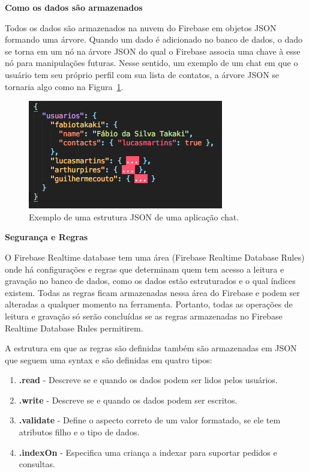 \documentclass[12pt]{article}
\begin{document}
\textbf{Como os dados são armazenados}

Todos os dados são armazenados na nuvem do Firebase em objetos JSON formando uma árvore. Quando um dado é adicionado no banco de dados, o dado se torna em um nó na árvore JSON do qual o Firebase associa uma chave à esse nó para manipulações futuras. Nesse sentido, um exemplo de um chat em que o usuário tem seu próprio perfil com sua lista de contatos, a árvore JSON se tornaria algo como na Figura~\ref{fig:json-tree}.

\begin{figure}[ht]
\centering
\includegraphics[width=.5\textwidth]{json-tree.png}
\caption{Exemplo de uma estrutura JSON de uma aplicação chat.}
\label{fig:json-tree}
\end{figure}


\textbf{Segurança e Regras}

O Firebase Realtime database tem uma área (Firebase Realtime Database Rules) onde há configurações e regras que determinam quem tem acesso a leitura e gravação no banco de dados, como os dados estão estruturados e o qual índices existem. Todas as regras ficam armazenadas nessa área do Firebase e podem ser alteradas a qualquer momento na ferramenta. Portanto, todas as operações de leitura e gravação só serão concluídas se as regras armazenadas no Firebase Realtime Database Rules permitirem. 

A estrutura em que as regras são definidas também são armazenadas em JSON que seguem uma syntax e são definidas em quatro tipos: 
\begin{enumerate}
  \item \textbf{.read} - Descreve se e quando os dados podem ser lidos pelos usuários.
  \item \textbf{.write} - Descreve se e quando os dados podem ser escritos.
  \item \textbf{.validate} - Define o aspecto correto de um valor formatado, se ele tem atributos filho e o tipo de dados.
  \item \textbf{.indexOn} - Especifica uma criança a indexar para suportar pedidos e consultas.
\end{enumerate}
\end{document}
